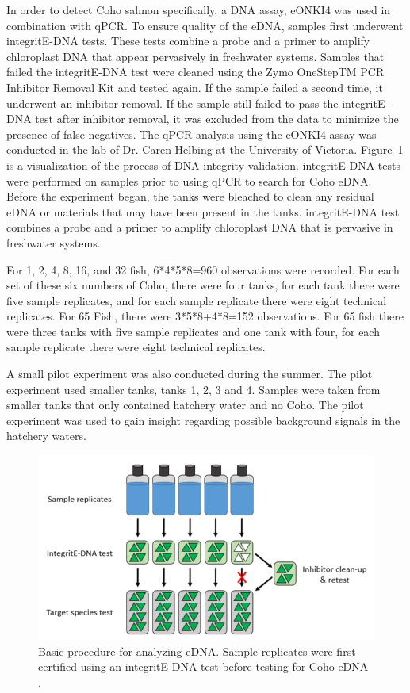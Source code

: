 \vspace{5mm}

In order to detect Coho salmon specifically, a DNA assay,  eONKI4 was used in combination with qPCR. To ensure quality of the eDNA, samples first underwent integritE-DNA tests. These tests combine a probe and a primer to amplify chloroplast DNA that appear pervasively in freshwater systems. Samples that failed the integritE-DNA test were cleaned using the Zymo OneStepTM PCR Inhibitor Removal Kit  and tested again. If the sample failed a second time, it underwent an inhibitor removal. If the sample still failed to pass the integritE-DNA test after inhibitor removal, it was excluded from the data to minimize the presence of false negatives. The qPCR analysis using the eONKI4 assay was conducted in the lab of Dr. Caren Helbing at the University of Victoria. Figure~\ref{fig:densityschedule} is a visualization of the process of DNA integrity validation. integritE-DNA tests were performed on samples prior to using qPCR to search for Coho eDNA. Before the experiment began, the tanks were bleached to clean any residual eDNA or materials that may have been present in the tanks. integritE-DNA test combines a probe and a primer to amplify chloroplast DNA that is pervasive in freshwater systems. 

\vspace{5mm}


For 1, 2, 4, 8, 16, and 32 fish, 6*4*5*8=960 observations were recorded. For each set of these six numbers of Coho, there were four tanks, for each tank there were five sample replicates, and for each sample replicate there were eight technical replicates.
For 65 Fish, there were 3*5*8+4*8=152 observations. For 65 fish there were three tanks with five sample replicates and one tank with four, for each sample replicate there were eight technical replicates.

\vspace{5mm}

A small pilot experiment was also conducted during the summer. The pilot experiment used smaller tanks, tanks 1, 2, 3 and 4.  Samples were taken from smaller tanks that only contained hatchery water and no Coho. The pilot experiment was used to gain insight regarding possible background signals in the hatchery waters.



\begin{figure}[H]
\includegraphics[scale=0.75]{Chapter3Images/integritE.png}
\caption{ Basic procedure for analyzing eDNA. Sample replicates were first certified using an integritE-DNA test before testing for Coho eDNA \citep{berg}.}
\label{fig:densityschedule}
\end{figure}

